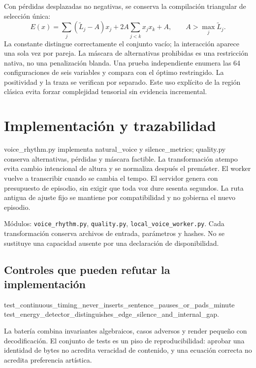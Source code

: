 \documentclass[10pt,a4paper]{article}
\begin{document}
Con pérdidas desplazadas no negativas, se conserva la compilación triangular de selección única:
\begin{equation}
E(x)=\sum_j(\widetilde L_j-A)x_j+2A\sum_{j<k}x_jx_k+A,\qquad A>\max_j\widetilde L_j.
\end{equation}
La constante distingue correctamente el conjunto vacío; la interacción aparece una sola vez por pareja. La máscara de alternativas prohibidas es una restricción nativa, no una penalización blanda. Una prueba independiente enumera las 64 configuraciones de seis variables y compara con el óptimo restringido. La positividad y la traza se verifican por separado. Este uso explícito de la región clásica evita forzar complejidad tensorial sin evidencia incremental.
\section{Implementación y trazabilidad}
voice\_\allowbreak{}rhythm.py implementa natural\_\allowbreak{}voice y silence\_\allowbreak{}metrics; quality.py conserva alternativas, pérdidas y máscara factible. La transformación atempo evita cambio intencional de altura y se normaliza después el premáster. El worker vuelve a transcribir cuando se cambia el tempo. El servidor genera con presupuesto de episodio, sin exigir que toda voz dure sesenta segundos. La ruta antigua de ajuste fijo se mantiene por compatibilidad y no gobierna el nuevo episodio.

Módulos: \texttt{voice\_\allowbreak{}rhythm.py}, \texttt{quality.py}, \texttt{local\_\allowbreak{}voice\_\allowbreak{}worker.py}. Cada transformación conserva archivos de entrada, parámetros y hashes. No se sustituye una capacidad ausente por una declaración de disponibilidad.
\subsection{Controles que pueden refutar la implementación}
\begin{flushleft}\small test\_\allowbreak{}continuous\_\allowbreak{}timing\_\allowbreak{}never\_\allowbreak{}inserts\_\allowbreak{}sentence\_\allowbreak{}pauses\_\allowbreak{}or\_\allowbreak{}pads\_\allowbreak{}minute\\ test\_\allowbreak{}energy\_\allowbreak{}detector\_\allowbreak{}distinguishes\_\allowbreak{}edge\_\allowbreak{}silence\_\allowbreak{}and\_\allowbreak{}internal\_\allowbreak{}gap.\end{flushleft}

La batería combina invariantes algebraicos, casos adversos y render pequeño con decodificación. El conjunto de tests es un piso de reproducibilidad: aprobar una identidad de bytes no acredita veracidad de contenido, y una ecuación correcta no acredita preferencia artística.
\end{document}
